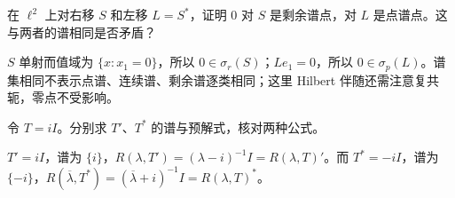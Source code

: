 \begin{exercise}[移位的谱型变化]\label{ex:y8-dual-shift}
在 $\ell^2$ 上对右移 $S$ 和左移 $L=S^*$，证明 $0$ 对 $S$ 是剩余谱点，对 $L$ 是点谱点。这与两者的谱相同是否矛盾？
\end{exercise}
\begin{solution}
$S$ 单射而值域为 $\{x:x_1=0\}$，所以 $0\in\sigma_r(S)$；$Le_1=0$，所以 $0\in\sigma_p(L)$。谱集相同不表示点谱、连续谱、剩余谱逐类相同；这里 Hilbert 伴随还需注意复共轭，零点不受影响。
\end{solution}

\begin{exercise}[标量的共轭]\label{ex:y8-dual-scalar}
令 $T=iI$。分别求 $T'$、$T^*$ 的谱与预解式，核对两种公式。
\end{exercise}
\begin{solution}
$T'=iI$，谱为 $\{i\}$，$R(\lambda,T')=(\lambda-i)^{-1}I=R(\lambda,T)'$。而 $T^*=-iI$，谱为 $\{-i\}$，$R(\overline\lambda,T^*)=(\overline\lambda+i)^{-1}I=R(\lambda,T)^*$。
\end{solution}
